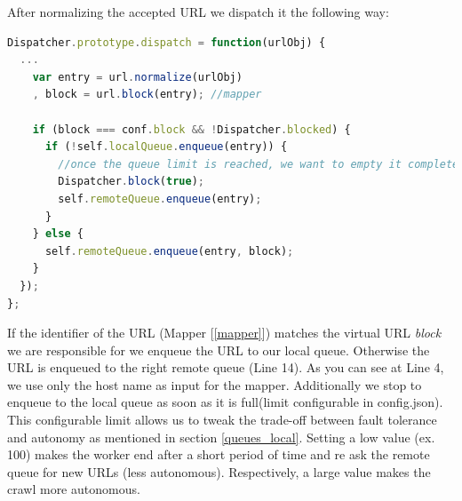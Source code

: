 After normalizing the accepted URL we dispatch it the following way:

\begin{lstlisting}[language=JavaScript]
Dispatcher.prototype.dispatch = function(urlObj) {
  ...
    var entry = url.normalize(urlObj)
    , block = url.block(entry); //mapper

    if (block === conf.block && !Dispatcher.blocked) {
      if (!self.localQueue.enqueue(entry)) {
        //once the queue limit is reached, we want to empty it completely
        Dispatcher.block(true);
        self.remoteQueue.enqueue(entry);
      }
    } else {
      self.remoteQueue.enqueue(entry, block);
    }
  });
};
\end{lstlisting}

If the identifier of the URL (Mapper [\ref{mapper}]) matches the virtual URL \emph{block} we are responsible for we enqueue the URL to our local queue. Otherwise the URL is enqueued to the right remote queue (Line 14). As you can see at Line 4, we use only the host name as input for the mapper. Additionally we stop to enqueue to the local queue as soon as it is full(limit configurable in config.json). This configurable limit allows us to tweak the trade-off between fault tolerance and autonomy as mentioned in section \ref{queues_local}. Setting a low value (ex. 100) makes the worker end after a short period of time and re ask the remote queue for new URLs (less autonomous). Respectively, a large value makes the crawl more autonomous.

